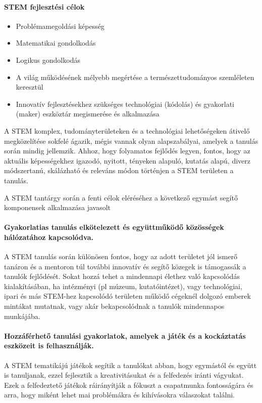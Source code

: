 \paragraph{STEM fejlesztési célok}
\begin{itemize}
\item Problémamegoldási képesség
\item  Matematikai gondolkodás
\item  Logikus gondolkodás
\item  A világ működésének mélyebb megértése a természettudományos szemléleten keresztül
\item  Innovatív fejlesztésekhez szükséges technológiai (kódolás) és gyakorlati (maker) eszköztár megismerése és alkalmazása
\end{itemize}

A STEM komplex, tudományterületeken és a technológiai lehetőségeken átivelő megközelítése sokfelé ágazik, mégis vannak olyan alapszabályai, amelyek a tanulás során mindig jellemzik. Ahhoz, hogy folyamatos fejlődés legyen, fontos, hogy az aktuális képességekhez igazodó, nyitott, tényeken alapuló, kutatás alapú, diverz módszertanú, skálázható és releváns módon történjen a STEM területen a tanulás.

A STEM tantárgy során a fenti célok eléréséhez a következő egymást segítő komponensek alkalmazása javasolt


\paragraph{Gyakorlatias tanulás elkötelezett és együttműködő közösségek hálózatához kapcsolódva.}
A STEM tanulás során különösen fontos, hogy az adott területet jól ismerő tanáron és a mentoron túl további innovatív és segítő közegek is támogassák a tanulók fejlődését. Sokat hozzá tehet a mindennapi élethez való kapcsolódás kialakításában, ha intézményi (pl múzeum, kutatóintézet), vagy technológiai, ipari és más STEM-hez kapcsolódó területen működő cégeknél dolgozó emberek mintákat mutatnak, vagy akár bekapcsolódnak a tanulók mindennapos munkájába.

\paragraph{Hozzáférhető tanulási gyakorlatok, amelyek a játék és a kockáztatás eszközeit is felhasználják.} A STEM tematikájú játékok segítik a tanulókat abban, hogy egymástól és együtt is tanuljanak, ezzel fejlesztik a kreativitásukat és a felfedezés iránti vágyukat. Ezek a felfedeztető játékok ráirányítják a fókuszt a csapatmunka fontosságára és arra, hogy miként lehet mai problémákra és kihívásokra válaszokat találni.

